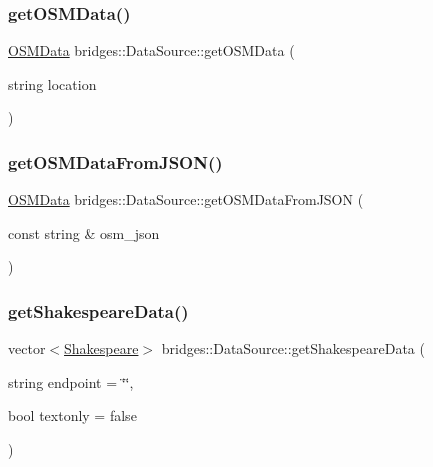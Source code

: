 \mbox{\label{classbridges_1_1_data_source_ac525a267494ac612616b924db29529d9}} 
\subsubsection{\texorpdfstring{getOSMData()}{getOSMData()}\hspace{0.1cm}{\footnotesize\ttfamily [2/2]}}
{\footnotesize\ttfamily \mbox{\hyperlink{classbridges_1_1_o_s_m_data}{O\+S\+M\+Data}} bridges\+::\+Data\+Source\+::get\+O\+S\+M\+Data (\begin{DoxyParamCaption}\item[{string}]{location }\end{DoxyParamCaption})\hspace{0.3cm}{\ttfamily [inline]}}

\mbox{\label{classbridges_1_1_data_source_a1b483de1cce9921b70116213382cdaf0}} 
\subsubsection{\texorpdfstring{getOSMDataFromJSON()}{getOSMDataFromJSON()}}
{\footnotesize\ttfamily \mbox{\hyperlink{classbridges_1_1_o_s_m_data}{O\+S\+M\+Data}} bridges\+::\+Data\+Source\+::get\+O\+S\+M\+Data\+From\+J\+S\+ON (\begin{DoxyParamCaption}\item[{const string \&}]{osm\+\_\+json }\end{DoxyParamCaption})\hspace{0.3cm}{\ttfamily [inline]}}

\mbox{\label{classbridges_1_1_data_source_a7502065879fed9a952ba1cf0c0c74185}} 
\subsubsection{\texorpdfstring{getShakespeareData()}{getShakespeareData()}}
{\footnotesize\ttfamily vector$<$\mbox{\hyperlink{classbridges_1_1_shakespeare}{Shakespeare}}$>$ bridges\+::\+Data\+Source\+::get\+Shakespeare\+Data (\begin{DoxyParamCaption}\item[{string}]{endpoint = {\ttfamily \char`\"{}\char`\"{}},  }\item[{bool}]{textonly = {\ttfamily false} }\end{DoxyParamCaption})\hspace{0.3cm}{\ttfamily [inline]}}

